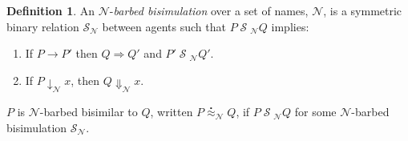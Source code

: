 \documentclass[]{amsart}
\makeatletter
\newcommand{\nameeq}{\mathbin{\equiv_N}}
\newcommand{\lift}[2]{#1 ! ( #2 )}
\newcommand{\quotep}[1]{@#1}
\newcommand{\red}{\rightarrow}
\newcommand{\wred}{\Rightarrow}
\newcommand{\parop}{\;|\;}		%
\newcommand{\rel}[1]{\;{\mathcal #1}\;} %
\newcommand{\wbbisim}{\stackrel{\centerdot}{\approx}} %
\newcommand{\fwbeq}{\stackrel{\circ}{\approx}}	%
\newcommand{\wbeq}{\approx}	%
\newtheorem{lem}[thm]{Lemma}
\theoremstyle{definition}
\newtheorem{defn}[thm]{Definition}
\theoremstyle{remark}
\newtheorem{rem}[thm]{Remark}
\numberwithin{equation}{subsection}
\makeatother
\begin{document}
\begin{defn}
An  ${\mathcal N}$-\emph{barbed bisimulation} over a set of names, ${\mathcal N}$, is a symmetric binary relation 
${\mathcal S}_{\mathcal N}$ between agents such that $P\rel{S}_{\mathcal N}Q$ implies:
\begin{enumerate}
\item If $P \red P'$ then $Q \wred Q'$ and $P'\rel{S}_{\mathcal N} Q'$.
\item If $P\downarrow_{\mathcal N} x$, then $Q\Downarrow_{\mathcal N} x$.
\end{enumerate}
$P$ is ${\mathcal N}$-barbed bisimilar to $Q$, written
$P \wbbisim_{\mathcal N} Q$, if $P \rel{S}_{\mathcal N} Q$ for some ${\mathcal N}$-barbed bisimulation ${\mathcal S}_{\mathcal N}$.
\end{defn}






\end{document}
